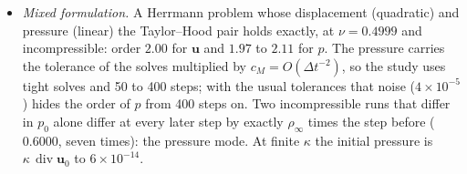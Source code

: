 \documentclass[11pt]{article}
\newcommand{\dive}{\operatorname{div}}
\newcommand{\bu}{\bm{u}}
\begin{document}
\begin{itemize}[nosep]
    schedule of each analysis.
  \item \emph{Mixed formulation.}  A Herrmann problem whose displacement
    (quadratic) and pressure (linear) the Taylor--Hood pair holds exactly, at
    $\nu = 0.4999$ and incompressible: order $2.00$ for $\bu$ and $1.97$ to
    $2.11$ for $p$.  The pressure carries the tolerance of the solves
    multiplied by $c_M = O(\Delta t^{-2})$, so the study uses tight solves
    and 50 to 400 steps; with the usual tolerances that noise ($4\times
    10^{-5}$) hides the order of $p$ from 400 steps on.  Two incompressible
    runs that differ in $p_0$ alone differ at every later step by exactly
    $\rho_\infty$ times the step before ($0.6000$, seven times): the
    pressure mode.  At finite $\kappa$ the initial pressure is
    $\kappa\,\dive\bu_0$ to $6\times10^{-14}$.
\end{itemize}
\end{document}
